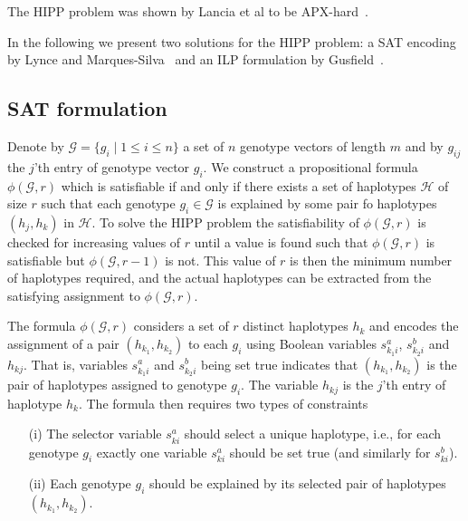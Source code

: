 \documentclass[12pt,a4paper]{article}
\begin{document}
The HIPP problem was shown by Lancia et al to be APX-hard~\cite{DBLP:journals/informs/LanciaPR04}.

In the following we present two solutions for the HIPP problem: a SAT encoding by Lynce and Marques-Silva~\cite{DBLP:conf/aaai/LynceM06} and an ILP formulation by Gusfield~\cite{DBLP:conf/cpm/Gusfield03}.

\subsection{SAT formulation}

Denote by $\mathcal{G}=\{g_i\mid 1\leq i \leq n\}$ a set of $n$ genotype vectors of length $m$ and by $g_{ij}$ the $j$'th entry of genotype vector $g_i$.
We construct a propositional formula $\phi (\mathcal{G}, r)$ which is satisfiable if and only if there exists a set of haplotypes $\mathcal{H}$ of size $r$ such that each genotype $g_i\in \mathcal{G}$ is explained by some pair fo haplotypes $(h_j, h_k)$ in $\mathcal{H}$.
To solve the HIPP problem the satisfiability of $\phi (\mathcal{G}, r)$ is checked for increasing values of $r$ until a value is found such that $\phi (\mathcal{G}, r)$ is satisfiable but $\phi (\mathcal{G}, r-1)$ is not.
This value of $r$ is then the minimum number of haplotypes required, and the actual haplotypes can be extracted from the satisfying assignment to $\phi (\mathcal{G}, r)$.

The formula $\phi (\mathcal{G}, r)$ considers a set of $r$ distinct haplotypes $h_k$ and encodes the assignment of a pair $(h_{k_1}, h_{k_2})$ to each $g_i$ using Boolean variables $s^a_{k_1i}$, $s^b_{k_2i}$ and $h_{kj}$.
That is, variables $s^a_{k_1i}$ and $s^b_{k_2i}$ being set true indicates that $(h_{k_1}, h_{k_2})$ is the pair of haplotypes assigned to genotype $g_i$.
The variable $h_{kj}$ is the $j$'th entry of haplotype $h_k$.
The formula then requires two types of constraints
\begin{enumerate}
\item[(i)] The selector variable $s^a_{ki}$ should select a unique haplotype, i.e., for each genotype $g_i$ exactly one variable $s^a_{ki}$ should be set true (and similarly for $s^b_{ki}$). 
\item[(ii)] Each genotype $g_i$ should be explained by its selected pair of haplotypes $(h_{k_1}, h_{k_2})$. 
\end{enumerate}
\end{document}
